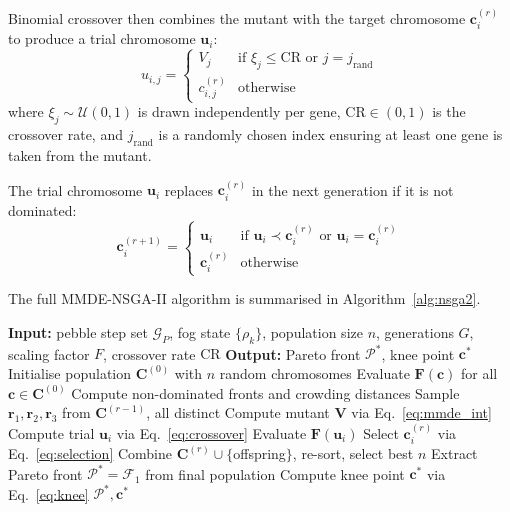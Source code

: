 \documentclass[12pt,a4paper]{article}
\theoremstyle{definition}
\theoremstyle{remark}
\begin{document}
Binomial crossover then combines the mutant with the target chromosome
$\mathbf{c}_i^{(r)}$ to produce a trial chromosome $\mathbf{u}_i$:
\begin{equation}
  u_{i,j} =
  \begin{cases}
    V_j              & \text{if } \xi_j \leq \mathrm{CR} \text{ or } j = j_{\text{rand}} \\
    c_{i,j}^{(r)}   & \text{otherwise}
  \end{cases}
  \label{eq:crossover}
\end{equation}
where $\xi_j \sim \mathcal{U}(0,1)$ is drawn independently per gene,
$\mathrm{CR} \in (0,1)$ is the crossover rate, and $j_{\text{rand}}$ is a
randomly chosen index ensuring at least one gene is taken from the mutant.

The trial chromosome $\mathbf{u}_i$ replaces $\mathbf{c}_i^{(r)}$ in the
next generation if it is not dominated:
\begin{equation}
  \mathbf{c}_i^{(r+1)} =
  \begin{cases}
    \mathbf{u}_i       & \text{if } \mathbf{u}_i \prec \mathbf{c}_i^{(r)}
                         \text{ or } \mathbf{u}_i = \mathbf{c}_i^{(r)} \\
    \mathbf{c}_i^{(r)} & \text{otherwise}
  \end{cases}
  \label{eq:selection}
\end{equation}

The full MMDE-NSGA-II algorithm is summarised in Algorithm~\ref{alg:nsga2}.

\begin{algorithm}[H]
\caption{TOF-MMDE-NSGA-II Offline Optimiser}
\label{alg:nsga2}
\begin{algorithmic}[1]
\State \textbf{Input:} pebble step set $\mathcal{G}_P$, fog state
  $\{\rho_k\}$, population size $n$, generations $G$,
  scaling factor $F$, crossover rate $\mathrm{CR}$
\State \textbf{Output:} Pareto front $\mathcal{P}^*$, knee point $\mathbf{c}^*$
\State Initialise population $\mathbf{C}^{(0)}$ with $n$ random chromosomes
\State Evaluate $\bm{F}(\mathbf{c})$ for all $\mathbf{c} \in \mathbf{C}^{(0)}$
\State Compute non-dominated fronts and crowding distances
    \State Sample $\mathbf{r}_1, \mathbf{r}_2, \mathbf{r}_3$ from $\mathbf{C}^{(r-1)}$, all distinct
    \State Compute mutant $\mathbf{V}$ via Eq.~\eqref{eq:mmde_int}
    \State Compute trial $\mathbf{u}_i$ via Eq.~\eqref{eq:crossover}
    \State Evaluate $\bm{F}(\mathbf{u}_i)$
    \State Select $\mathbf{c}_i^{(r)}$ via Eq.~\eqref{eq:selection}
  \EndFor
  \State Combine $\mathbf{C}^{(r)} \cup \{$offspring$\}$, re-sort, select best $n$
\EndFor
\State Extract Pareto front $\mathcal{P}^* = \mathcal{F}_1$ from final population
\State Compute knee point $\mathbf{c}^*$ via Eq.~\eqref{eq:knee}
\State \Return $\mathcal{P}^*, \mathbf{c}^*$
\end{algorithmic}
\end{algorithm}
\end{document}
